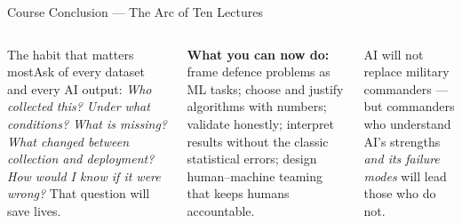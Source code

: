 \documentclass[aspectratio=169,10pt,t]{beamer}
\begin{document}
\begin{frame}{Course Conclusion --- The Arc of Ten Lectures}
\begin{columns}[T]
\begin{cbox}[ISSAnavy]{The habit that matters most}\scriptsize Ask of every dataset and every AI output: \emph{Who collected this? Under what conditions? What is missing? What changed between collection and deployment? How would I know if it were wrong?} That question will save lives.\end{cbox}
\begin{rbox}\scriptsize\textbf{What you can now do:} frame defence problems as ML tasks; choose and justify algorithms with numbers; validate honestly; interpret results without the classic statistical errors; design human--machine teaming that keeps humans accountable.\end{rbox}
\begin{wbox}\scriptsize AI will not replace military commanders --- but commanders who understand AI's strengths \emph{and its failure modes} will lead those who do not.\end{wbox}
\end{columns}
\end{frame}
\end{document}
